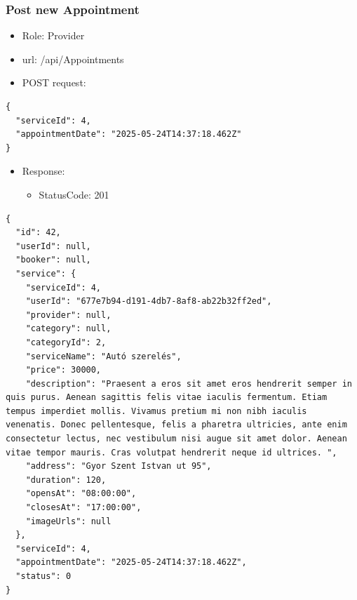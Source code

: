 \documentclass[11pt]{article}
\begin{document}
\subsubsection{Post new Appointment}
\label{sec:orgf24d946}
\begin{itemize}
\item Role: Provider
\item url: /api/Appointments
\item POST request:
\end{itemize}
\begin{verbatim}
{
  "serviceId": 4,
  "appointmentDate": "2025-05-24T14:37:18.462Z"
}
\end{verbatim}
\begin{itemize}
\item Response:
\begin{itemize}
\item StatusCode: 201
\end{itemize}
\end{itemize}
\begin{verbatim}
{
  "id": 42,
  "userId": null,
  "booker": null,
  "service": {
    "serviceId": 4,
    "userId": "677e7b94-d191-4db7-8af8-ab22b32ff2ed",
    "provider": null,
    "category": null,
    "categoryId": 2,
    "serviceName": "Autó szerelés",
    "price": 30000,
    "description": "Praesent a eros sit amet eros hendrerit semper in quis purus. Aenean sagittis felis vitae iaculis fermentum. Etiam tempus imperdiet mollis. Vivamus pretium mi non nibh iaculis venenatis. Donec pellentesque, felis a pharetra ultricies, ante enim consectetur lectus, nec vestibulum nisi augue sit amet dolor. Aenean vitae tempor mauris. Cras volutpat hendrerit neque id ultrices. ",
    "address": "Gyor Szent Istvan ut 95",
    "duration": 120,
    "opensAt": "08:00:00",
    "closesAt": "17:00:00",
    "imageUrls": null
  },
  "serviceId": 4,
  "appointmentDate": "2025-05-24T14:37:18.462Z",
  "status": 0
}
\end{verbatim}
\end{document}
